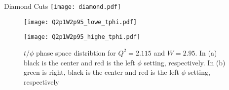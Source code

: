 %
%


\begin{Mfigure}{Diamond Cuts}
  \centering
  \texttt{[image: diamond.pdf]}
  \caption{Diamond cuts are the result of phase-space matching between high and low $\epsilon$ that show the kinematically accessible region. This is an example from $Q^2=3.0$, $W=3.23$. The red diamond is low and the blue is the high, corrsponding to $\epsilon=0.5736$ and $\epsilon=0.5736$, respectively.}
  \label{fig:7-1_diamond}
\end{Mfigure}


%
%


\clearpage


\begin{figure}
  \centering
  \begin{minipage}[b]{0.48\linewidth}
    \texttt{[image: Q2p1W2p95\_lowe\_tphi.pdf]}
  \end{minipage}
  \hfill
  \begin{minipage}[b]{0.48\linewidth}
    \texttt{[image: Q2p1W2p95\_highe\_tphi.pdf]}
  \end{minipage}  
  \caption{$t$/$\phi$ phase space distribtion for $Q^2=2.115$ and $W=2.95$. In (a) black is the center and red is the left $\phi$ setting, respectively. In (b) green is right, black is the center and red is the left $\phi$ setting, respectively}
  \label{fig:Q2p1W2p95_tphi}
\end{figure}

